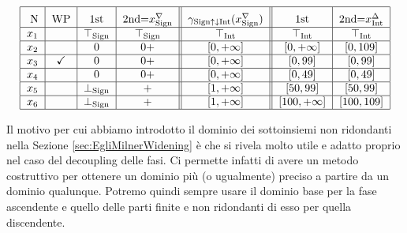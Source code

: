 \begin{example}
\begin{table}
\begin{minipage}{\textwidth}
\[\begin{tabular}{|c|c|c|c||c||c|c|c||}
        \hline 
        \rule{0pt}{14pt} N & WP & 1st & 2nd=\(x^{\nabla}_{\textrm{Sign}}\) & 
        \(\gamma_{\textrm{Sign}\uparrow\downarrow\textrm{Int}}(x^{\nabla}_{\textrm{Sign}})\)& 
        1st & 2nd=\(x^{\Delta}_{\textrm{Int}}\)  \\
        \hline
        $x_1$ &  &  
            $\top_{\textrm{Sign}}$ & $\top_{\textrm{Sign}}$ & 
            $\top_{\textrm{Int}}$ & 
            $\top_{\textrm{Int}}$ & $\top_{\textrm{Int}}$ \\
        \hline
        $x_2$ &  & 
            0 & 0+ & 
            $\left[0, +\infty \right]$ & 
            $\left[0, +\infty \right]$ & $\left[0, 109\right]$ \\
        \hline
        $x_3$ & \checkmark & 
            0 & 0+ & 
            $\left[0, +\infty \right]$ & 
            $\left[0, 99\right]$ & $\left[0, 99\right]$ \\
        \hline
        $x_4$ &  & 
            0 & 0+ & 
            $\left[0, +\infty\right]$ & 
            $\left[0, 49\right]$ & $\left[0, 49\right]$ \\
        \hline
        $x_5$ &  & 
            $\perp_{\textrm{Sign}}$ & + & 
            $\left[1, +\infty \right]$ & 
            $\left[50, 99\right]$ & $\left[50, 99\right]$ \\
        \hline
        $x_6$ &  & 
            $\perp_{\textrm{Sign}}$ & + & 
            $\left[1, +\infty \right]$ & 
            $\left[100, +\infty \right]$ & $\left[100, 109\right]$ \\
        \hline
        \end{tabular}
        \]
    \end{minipage}
    \caption{Tabella dei risultati del dominio \(\textrm{Sign}\uparrow\downarrow\textrm{Int}\) divisi per step e fase.}
    \label{fig:risDecSingInt}
\end{table}
\end{example}

Il motivo per cui abbiamo introdotto il dominio dei sottoinsiemi non ridondanti nella Sezione \ref{sec:EgliMilnerWidening} è che si rivela molto utile e adatto proprio nel caso del decoupling delle fasi. Ci permette infatti di avere un metodo costruttivo per ottenere un dominio più (o ugualmente) preciso a partire da un dominio qualunque. Potremo quindi sempre usare il dominio base per la fase ascendente e quello delle parti finite e non ridondanti di esso per quella discendente. 

